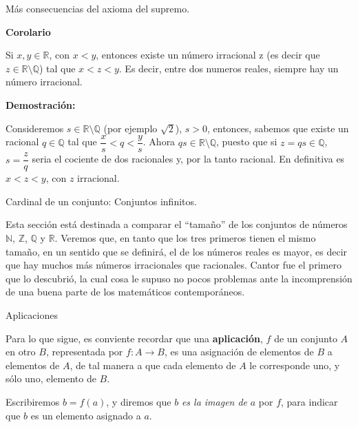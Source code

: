 \documentclass[
  ignorenonframetext,
]{beamer}
\begin{document}
\begin{frame}{Más consecuencias del axioma del supremo.}
\protect\hypertarget{muxe1s-consecuencias-del-axioma-del-supremo.-1}{}

\textbf{Corolario}

Si \(x,y \in \mathbb{R}\), con \(x<y\), entonces existe un número
irracional z (es decir que \(z \in \mathbb{R} \setminus \mathbb{Q}\))
tal que \(x<z<y\). Es decir, entre dos numeros reales, siempre hay un
número irracional.

\textbf{Demostración:}

Consideremos \(s \in \mathbb{R} \setminus \mathbb{Q}\) (por ejemplo
\(\sqrt{2}\)), \(s>0\), entonces, sabemos que existe un racional
\(q \in \mathbb{Q}\) tal que \(\dfrac{x}{s} <q < \dfrac{y}{s}\). Ahora
\(qs \in \mathbb{R} \setminus \mathbb{Q}\), puesto que si
\(z=qs \in \mathbb{Q}\), \(s=\dfrac{z}{q}\) seria el cociente de dos
racionales y, por la tanto racional. En definitiva es \(x<z<y\), con
\(z\) irracional.

\end{frame}

\begin{frame}{Cardinal de un conjunto: Conjuntos infinitos.}
\protect\hypertarget{cardinal-de-un-conjunto-conjuntos-infinitos.}{}

Esta sección está destinada a comparar el ``tamaño'' de los conjuntos de
números \(\mathbb{N}\), \(\mathbb{Z}\), \(\mathbb{Q}\) y \(\mathbb{R}\).
Veremos que, en tanto que los tres primeros tienen el mismo tamaño, en
un sentido que se definirá, el de los números reales es mayor, es decir
que hay muchos más números irracionales que racionales. Cantor fue el
primero que lo descubrió, la cual cosa le supuso no pocos problemas ante
la incomprensión de una buena parte de los matemáticos contemporáneos.

\end{frame}

\begin{frame}{Aplicaciones}
\protect\hypertarget{aplicaciones}{}

Para lo que sigue, es conviente recordar que una \textbf{aplicación},
\(f\) de un conjunto \(A\) en otro \(B\), representada por
\(f: A \rightarrow B\), es una asignación de elementos de \(B\) a
elementos de \(A\), de tal manera a que cada elemento de \(A\) le
corresponde uno, y sólo uno, elemento de \(B\).

Escribiremos \(b=f(a)\), y diremos que \(b\) \emph{es la imagen de}
\(a\) por \(f\), para indicar que \(b\) es un elemento asignado a \(a\).

\end{frame}
\end{document}
